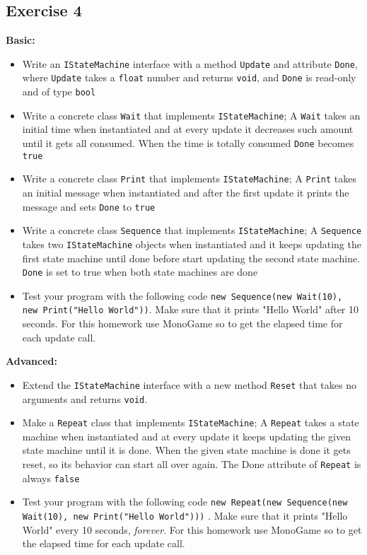      \subsection{Exercise 4}
     \label{chapter: Reuse through polymorphism}     
     	 \textbf{Basic:}

	     \begin{itemize}
	     	\item Write an \texttt{IStateMachine} interface with a method \texttt{Update} and attribute \texttt{Done}, where \texttt{Update} takes a \texttt{float} number and returns \texttt{void}, and \texttt{Done} is read-only and of type \texttt{bool}
	     	\item Write a concrete class \texttt{Wait} that implements \texttt{IStateMachine}; A \texttt{Wait} takes an initial time when instantiated and at every update it decreases such amount until it gets all consumed. When the time is totally consumed \texttt{Done} becomes \texttt{true}
		    \item Write a concrete class \texttt{Print} that implements \texttt{IStateMachine}; A \texttt{Print} takes an initial message when instantiated and after the first update it prints the message and sets \texttt{Done} to \texttt{true}
		    \item Write a concrete class \texttt{Sequence} that implements \texttt{IStateMachine}; A \texttt{Sequence} takes two \texttt{IStateMachine} objects when instantiated and it keeps updating the first state machine until done before start updating the second state machine. \texttt{Done} is set to true when both state machines are done  
		    \item Test your program with the following code \texttt{new Sequence(new Wait(10), new Print("Hello World"))}. Make sure that it prints "Hello World" after 10 seconds. For this homework use MonoGame so to get the elapsed time for each update call.
	     \end{itemize}

	     \textbf{Advanced:}

	     \begin{itemize}
	     	\item Extend the \texttt{IStateMachine} interface with a new method \texttt{Reset} that takes no arguments and returns \texttt{void}.
	     	\item Make a \texttt{Repeat} class that implements \texttt{IStateMachine}; A \texttt{Repeat} takes a state machine when instantiated and at every update it keeps updating the given state machine until it is done. When the given state machine is done it gets reset, so its behavior can start all over again. The {Done} attribute of \texttt{Repeat} is always \texttt{false}
	     	\item Test your program with the following code \texttt{new Repeat(new Sequence(new Wait(10), new Print("Hello World")))} . Make sure that it prints "Hello World" every 10 seconds, \textit{forever}. For this homework use MonoGame so to get the elapsed time for each update call.
	     \end{itemize}




